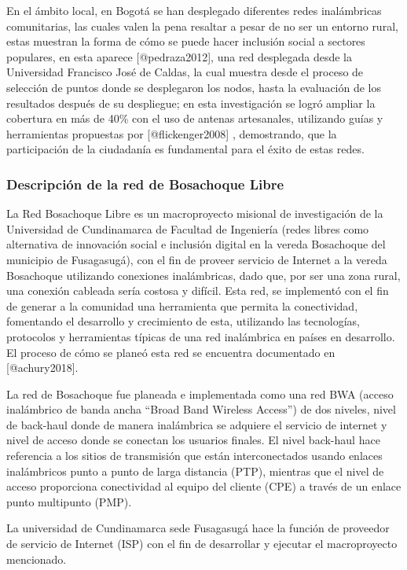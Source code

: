 \documentclass[]{article}
\begin{document}
En el ámbito local, en Bogotá se han desplegado diferentes redes
inalámbricas comunitarias, las cuales valen la pena resaltar a pesar de
no ser un entorno rural, estas muestran la forma de cómo se puede hacer
inclusión social a sectores populares, en esta aparece
{[}@pedraza2012{]}, una red desplegada desde la Universidad Francisco
José de Caldas, la cual muestra desde el proceso de selección de puntos
donde se desplegaron los nodos, hasta la evaluación de los resultados
después de su despliegue; en esta investigación se logró ampliar la
cobertura en más de 40\% con el uso de antenas artesanales, utilizando
guías y herramientas propuestas por {[}@flickenger2008{]} , demostrando,
que la participación de la ciudadanía es fundamental para el éxito de
estas redes.

\subsubsection{Descripción de la red de Bosachoque
Libre}\label{descripciuxf3n-de-la-red-de-bosachoque-libre}

La Red Bosachoque Libre es un macroproyecto misional de investigación de
la Universidad de Cundinamarca de Facultad de Ingeniería (redes libres
como alternativa de innovación social e inclusión digital en la vereda
Bosachoque del municipio de Fusagasugá), con el fin de proveer servicio
de Internet a la vereda Bosachoque utilizando conexiones inalámbricas,
dado que, por ser una zona rural, una conexión cableada sería costosa y
difícil. Esta red, se implementó con el fin de generar a la comunidad
una herramienta que permita la conectividad, fomentando el desarrollo y
crecimiento de esta, utilizando las tecnologías, protocolos y
herramientas típicas de una red inalámbrica en países en desarrollo. El
proceso de cómo se planeó esta red se encuentra documentado en
{[}@achury2018{]}.

La red de Bosachoque fue planeada e implementada como una red BWA
(acceso inalámbrico de banda ancha ``Broad Band Wireless Access'') de
dos niveles, nivel de back-haul donde de manera inalámbrica se adquiere
el servicio de internet y nivel de acceso donde se conectan los usuarios
finales. El nivel back-haul hace referencia a los sitios de transmisión
que están interconectados usando enlaces inalámbricos punto a punto de
larga distancia (PTP), mientras que el nivel de acceso proporciona
conectividad al equipo del cliente (CPE) a través de un enlace punto
multipunto (PMP).

La universidad de Cundinamarca sede Fusagasugá hace la función de
proveedor de servicio de Internet (ISP) con el fin de desarrollar y
ejecutar el macroproyecto mencionado.
\end{document}
